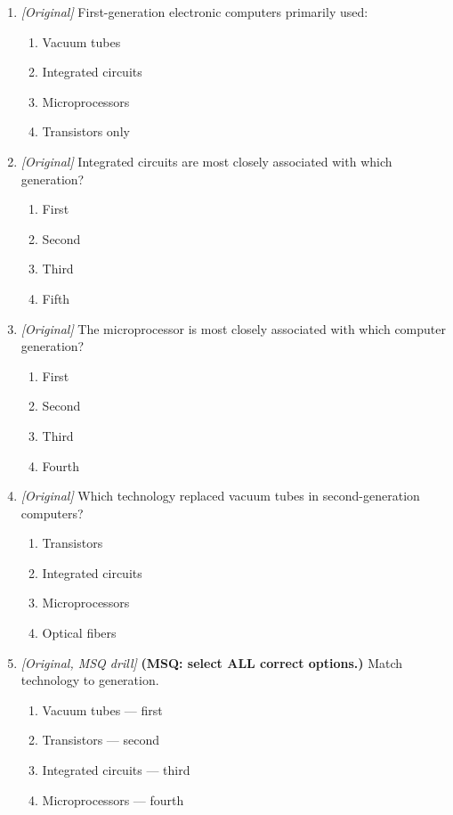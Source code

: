 \begin{enumerate}[label=\textbf{Q\arabic*.}, leftmargin=*]
\begin{enumerate}[label=\Alph*.]
    \item Fourth-generation machines used microprocessors.
    \item Fifth-generation goals include artificial intelligence.
  \end{enumerate}
\item \textit{[Original]} First-generation electronic computers primarily used:
  \begin{enumerate}[label=\Alph*.]
\item Vacuum tubes
   \item Integrated circuits
   \item Microprocessors
   \item Transistors only
  \end{enumerate}

\item \textit{[Original]} Integrated circuits are most closely associated with which generation?
  \begin{enumerate}[label=\Alph*.]
\item First
   \item Second
   \item Third
   \item Fifth
  \end{enumerate}

\item \textit{[Original]} The microprocessor is most closely associated with which computer generation?
  \begin{enumerate}[label=\Alph*.]
\item First
   \item Second
   \item Third
   \item Fourth
  \end{enumerate}

\item \textit{[Original]} Which technology replaced vacuum tubes in second-generation computers?
  \begin{enumerate}[label=\Alph*.]
\item Transistors
   \item Integrated circuits
   \item Microprocessors
   \item Optical fibers
  \end{enumerate}

\item \textit{[Original, MSQ drill]} \textbf{(MSQ: select ALL correct options.)} Match technology to generation.
  \begin{enumerate}[label=\Alph*.]
\item Vacuum tubes --- first
   \item Transistors --- second
   \item Integrated circuits --- third
   \item Microprocessors --- fourth
  \end{enumerate}

\end{enumerate}
